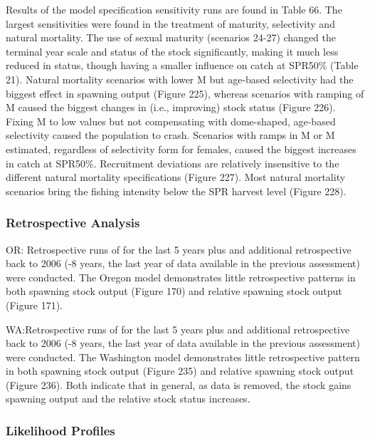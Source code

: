 \documentclass[11pt,
  english,
  letterpaper,
]{article}
\begin{document}
Results of the model specification sensitivity runs are found in Table 66. The largest sensitivities were found in the treatment of maturity, selectivity and natural mortality. The use of sexual maturity (scenarios 24-27) changed the terminal year scale and status of the stock significantly, making it much less reduced in status, though having a smaller influence on catch at SPR50\% (Table 21). Natural mortality scenarios with lower M but age-based selectivity had the biggest effect in spawning output (Figure 225), whereas scenarios with ramping of M caused the biggest changes in (i.e., improving) stock status (Figure 226). Fixing M to low values but not compensating with dome-shaped, age-based selectivity caused the population to crash. Scenarios with ramps in M or M estimated, regardless of selectivity form for females, caused the biggest increases in catch at SPR50\%. Recruitment deviations are relatively insensitive to the different natural mortality specifications (Figure 227). Most natural mortality scenarios bring the fishing intensity below the SPR harvest level (Figure 228).

\hypertarget{retrospective-analysis}{%
\subsubsection{Retrospective Analysis}\label{retrospective-analysis}}

OR: Retrospective runs of for the last 5 years plus and additional retrospective back to 2006 (-8 years, the last year of data available in the previous assessment) were conducted. The Oregon model demonstrates little retrospective patterns in both spawning stock output (Figure 170) and relative spawning stock output (Figure 171).

WA:Retrospective runs of for the last 5 years plus and additional retrospective back to 2006 (-8 years, the last year of data available in the previous assessment) were conducted. The Washington model demonstrates little retrospective pattern in both spawning stock output (Figure 235) and relative spawning stock output (Figure 236). Both indicate that in general, as data is removed, the stock gains spawning output and the relative stock status increases.

\hypertarget{likelihood-profiles}{%
\subsubsection{Likelihood Profiles}\label{likelihood-profiles}}
\end{document}
